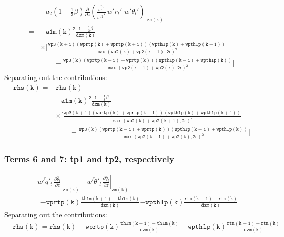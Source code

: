 \documentclass[11pt,fleqn]{article}
\newcommand{\ptlder}[2]{\frac{\partial #1}{\partial #2}}
\begin{document}
\begin{equation}
\begin{split}
& - \left. a_2 \left( 1 - \frac{1}{3}\beta \right)
       \ptlder{}{z}
         \left( 
           \frac{\overline{w^{'3}}}{\overline{w^{'2}}^2} \,
           \overline{w'r_t'} \; \overline{w'\theta_l'}
         \right) \right|_{\mathtt{zm(k)}} \\
=& \mathtt{
   - a1m(k)^{2}\frac{1 - \frac{1}{3}\beta}{dzm(k)} } \\
 & \mathtt{
     \times \bigg[ \frac{wp3(k+1) 
                         \left(wprtp(k)+wprtp(k+1)\right)
                         \left(wpthlp(k)+wpthlp(k+1)\right)}
                        {\max\left(wp2(k)+wp2(k+1),2\epsilon\right)^2} } \\
 & \mathtt{ \quad \quad
                  -\frac{wp3(k) 
                         \left(wprtp(k-1)+wprtp(k)\right)
                         \left(wpthlp(k-1)+wpthlp(k)\right)}
                        {\max\left(wp2(k-1)+wp2(k),2\epsilon\right)^2}
            \bigg]
   }
\end{split}
\end{equation}
%
Separating out the contributions:
%
\begin{equation}
\begin{split}
\mathtt{rhs(k)} =& \mathtt{rhs(k)} \\
 & \mathtt{ - a1m(k)^{2}\frac{1 - \frac{1}{3}\beta}{dzm(k)} } \\
 & \mathtt{ \times 
      \bigg[ \frac{wp3(k+1) 
                   \left(wprtp(k)+wprtp(k+1)\right) 
                   \left(wpthlp(k)+wpthlp(k+1)\right)}
                  {\max\left(wp2(k)+wp2(k+1),2\epsilon\right)^2} } \\
 & \mathtt{ \quad \quad
            -\frac{wp3(k) 
                   \left(wprtp(k-1)+wprtp(k)\right) 
                   \left(wpthlp(k-1)+wpthlp(k)\right)}
                  {\max\left(wp2(k-1)+wp2(k),2\epsilon\right)^2}
      \bigg]
   }
\end{split}
\end{equation}

\subsubsection{Terms 6 and 7:  tp1 and tp2, respectively}

\begin{equation}
\begin{split}
&\left. -\,\overline{w'q'_t} \, \ptlder{\bar{\theta}_l}{z} \right|_{\mathtt{zm(k)}}
 \left. -\,\overline{w'\theta'_l} \, \ptlder{\bar{q}_t}{z} \right|_{\mathtt{zm(k)}} \\
&= \mathtt{ - wprtp(k) \frac{thlm(k+1)-thlm(k)}{dzm(k)} }
   \mathtt{ - wpthlp(k) \frac{rtm(k+1)-rtm(k)}{dzm(k)} }
\end{split}
\end{equation}
%
Separating out the contributions:
%
\begin{equation}
\begin{split}
&\mathtt{rhs(k) = rhs(k) - wprtp(k) \frac{thlm(k+1)-thlm(k)}{dzm(k)}
                     - wpthlp(k) \frac{rtm(k+1)-rtm(k)}{dzm(k)} }
\end{split}
\end{equation}
\end{document}
